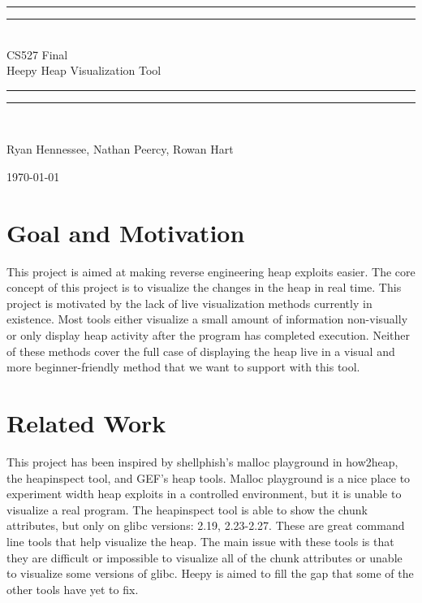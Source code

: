 \documentclass[12pt]{article}
\newlength{\drop}
\begin{document}
\begin{titlepage}
	\textheight
	\centering
	\vspace*{\baselineskip}
	\rule{\textwidth}{1.6pt}\vspace*{-\baselineskip}\vspace*{2pt}
	\rule{\textwidth}{0.4pt}\\[\baselineskip]
	{\LARGE CS527 Final \\[0.3\baselineskip] Heepy Heap Visualization Tool}\\[0.2\baselineskip]
	\rule{\textwidth}{0.4pt}\vspace*{-\baselineskip}\vspace{3.2pt}
	\rule{\textwidth}{1.6pt}\\[\baselineskip]
	\scshape
	\vspace*{2\baselineskip}
	{\Large Ryan Hennessee, Nathan Peercy, Rowan Hart\par}
	\vspace*{2\baselineskip}
	{\scshape \today} \\
	\vfill
\end{titlepage}

\section{Goal and Motivation}

\hspace{\parindent} This project is aimed at making reverse engineering heap exploits easier. The core concept of this project is to visualize the changes in the heap in real time. This project is motivated by the lack of live visualization methods currently in existence. Most tools either visualize a small amount of information non-visually or only display heap activity after the program has completed execution. Neither of these methods cover the full case of displaying the heap live in a visual and more beginner-friendly method that we want to support with this tool. \\

\section{Related Work}

\hspace{\parindent} This project has been inspired by shellphish’s malloc playground in how2heap, the heapinspect tool, and GEF’s heap tools. Malloc playground is a nice place to experiment width heap exploits in a controlled environment, but it is unable to visualize a real program. The heapinspect tool is able to show the chunk attributes, but only on glibc versions: 2.19, 2.23-2.27. These are great command line tools that help visualize the heap. The main issue with these tools is that they are difficult or impossible to visualize all of the chunk attributes or unable to visualize some versions of glibc. Heepy is aimed to fill the gap that some of the other tools have yet to fix.  \\
\end{document}
